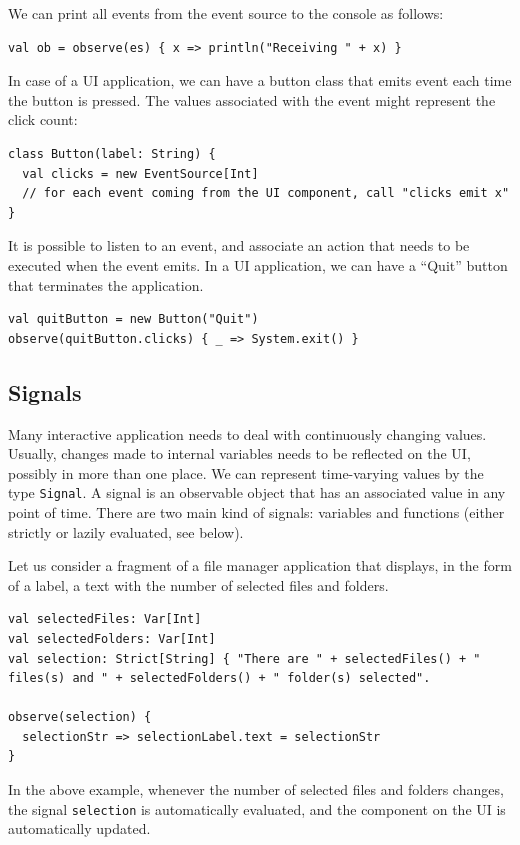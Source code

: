 We can print all events from the event source to the console as follows:
\begin{lstlisting}
val ob = observe(es) { x => println("Receiving " + x) }
\end{lstlisting}

In case of a UI application, we can have a button class that emits event each time the button is pressed. The values associated with the event might represent the click count:

\begin{lstlisting}
class Button(label: String) {
  val clicks = new EventSource[Int]
  // for each event coming from the UI component, call "clicks emit x"
}
\end{lstlisting}

It is possible to listen to an event, and associate an action that needs to be executed when the event emits. In a UI application, we can have a ``Quit'' button that terminates the application.
\begin{lstlisting}
val quitButton = new Button("Quit")
observe(quitButton.clicks) { _ => System.exit() }
\end{lstlisting}

\subsection{Signals}

Many interactive application needs to deal with continuously changing values. Usually, changes made to internal variables needs to be reflected on the UI, possibly in more than one place. We can represent time-varying values by the type \texttt{Signal}. A signal is an observable object that has an associated value in any point of time. There are two main kind of signals: variables and functions (either strictly or lazily evaluated, see below).

Let us consider a fragment of a file manager application that displays, in the form of a label, a text with the number of selected files and folders.

\begin{lstlisting}
val selectedFiles: Var[Int]
val selectedFolders: Var[Int]
val selection: Strict[String] { "There are " + selectedFiles() + " files(s) and " + selectedFolders() + " folder(s) selected".

observe(selection) {
  selectionStr => selectionLabel.text = selectionStr
}
\end{lstlisting}

In the above example, whenever the number of selected files and folders changes, the signal \texttt{selection} is automatically evaluated, and the component on the UI is automatically updated. 

